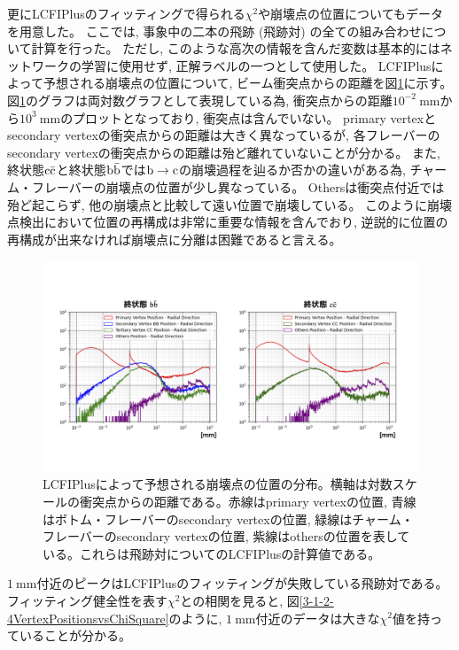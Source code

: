 更にLCFIPlusのフィッティングで得られる$\chi^2$や崩壊点の位置についてもデータを用意した。
ここでは, 事象中の二本の飛跡 (飛跡対) の全ての組み合わせについて計算を行った。
ただし, このような高次の情報を含んだ変数は基本的にはネットワークの学習に使用せず, 正解ラベルの一つとして使用した。
LCFIPlusによって予想される崩壊点の位置について, ビーム衝突点からの距離を図\ref{3-1-2-3VertexPositions}に示す。
図\ref{3-1-2-3VertexPositions}のグラフは両対数グラフとして表現している為, 衝突点からの距離$10^{-2}\ \mathrm{mm}$から$10^{3}\ \mathrm{mm}$のプロットとなっており, 衝突点は含んでいない。
primary vertexとsecondary vertexの衝突点からの距離は大きく異なっているが, 各フレーバーのsecondary vertexの衝突点からの距離は殆ど離れていないことが分かる。
また, 終状態$\rm c\bar{c}$と終状態$\rm b\bar{b}$では$\rm b \to c$の崩壊過程を辿るか否かの違いがある為, チャーム・フレーバーの崩壊点の位置が少し異なっている。
Othersは衝突点付近では殆ど起こらず, 他の崩壊点と比較して遠い位置で崩壊している。
このように崩壊点検出において位置の再構成は非常に重要な情報を含んでおり, 逆説的に位置の再構成が出来なければ崩壊点に分離は困難であると言える。

\begin{figure}[htbp]
 \centering
 \includegraphics[trim = 50 100 50 150, width=1.0\textwidth, clip]{Figure/3Networks/3-1-2-3VertexPositions.png}
 \caption[LCFIPlusによって予想される崩壊点の位置の分布]{LCFIPlusによって予想される崩壊点の位置の分布。横軸は対数スケールの衝突点からの距離である。赤線はprimary vertexの位置, 青線はボトム・フレーバーのsecondary vertexの位置, 緑線はチャーム・フレーバーのsecondary vertexの位置, 紫線はothersの位置を表している。これらは飛跡対についてのLCFIPlusの計算値である。}
 \label{3-1-2-3VertexPositions}
\end{figure}

$1\ \mathrm{mm}$付近のピークはLCFIPlusのフィッティングが失敗している飛跡対である。
フィッティング健全性を表す$\chi^2$との相関を見ると, 図\ref{3-1-2-4VertexPositionsvsChiSquare}のように, $1\ \mathrm{mm}$付近のデータは大きな$\chi^2$値を持っていることが分かる。

